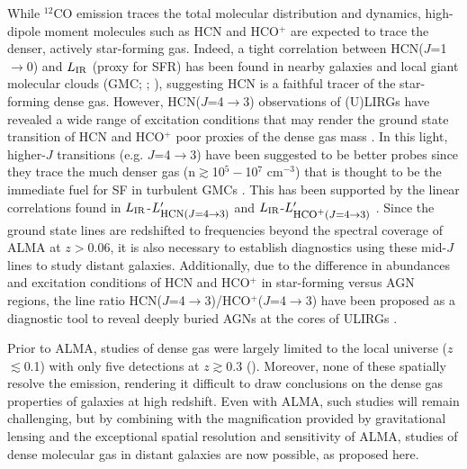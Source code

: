 \documentclass[12pt,a4paper]{article}
\newcommand{\comol}{$^{12}$CO\xspace}
\newcommand{\LIR}{\mbox{$L_{\rm IR}$}\xspace}
\newcommand{\rarr}{$\rightarrow$}
\newcommand{\ahcn}{HCN($J$=1\rarr0)\xspace}
\newcommand{\dhcn}{HCN($J$=4\rarr3)\xspace}
\newcommand{\hcop}{HCO$^+$\xspace}
\newcommand{\dhcop}{HCO$^+$($J$=4\rarr3)\xspace}
\newcommand{\Lp}[1][CO]{\mbox{$L^{\prime}_\textrm{\fontsize{8pt}{12pt}\selectfont{#1}}$}}
\begin{document}
While \comol emission traces the total molecular distribution and dynamics,
high-dipole moment molecules such as HCN and \hcop are expected to trace the 
denser, actively star-forming gas. Indeed, a tight correlation between \ahcn and \LIR 
(proxy for SFR) has been found in nearby galaxies and local giant molecular 
clouds (GMC; \citealt[hereafter GS04]{Gao04a}; \citealt{Wu05}), 
suggesting HCN is a faithful tracer of the star-forming dense gas.
However, \dhcn observations of (U)LIRGs have revealed a wide range of
excitation conditions 
that may render the ground state transition of 
HCN and \hcop poor proxies of the dense gas mass \citep[hereafter P07]{Papadopoulos07a}.
In this light, higher-$J$ transitions (e.g. $J$=4\rarr3) 
have been suggested to be better probes
since they trace the much denser gas (n$\gtrsim$10$^5-$10$^7$ cm$^{-3}$) that is 
thought to be the immediate fuel for SF in turbulent GMCs \citep{Shirley03a, KM05}. 
This has been supported by the linear correlations found in 
\LIR-\Lp[\dhcn] and \LIR-\Lp[\dhcop] \citep[hereafter Z14]{Zhang14a}.
Since the 
ground state lines are redshifted to frequencies beyond the spectral coverage of ALMA
at $z$$>$0.06, it is also necessary to establish diagnostics using these mid-$J$ lines to 
study distant galaxies.
Additionally, due to the difference in abundances and excitation conditions of HCN and \hcop
in star-forming versus AGN regions, the line 
ratio \dhcn/\dhcop \citep{Imanishi14a, GB14a, Viti14a} have been 
proposed as
a diagnostic tool to reveal deeply buried AGNs at the cores of ULIRGs \citep{Izumi16a, Imanishi16a}.

Prior to ALMA, studies of dense gas were largely limited to the local universe ($z$$\lesssim$0.1) 
with only five detections
at $z$$\gtrsim0.3$ 
(\citealt{Riechers06a, Riechers07a, Riechers10a, Wagg05a, Gao07a}).
Moreover, none of these 
spatially resolve the emission, rendering it difficult 
to draw conclusions on the dense gas properties of galaxies at high redshift. 
Even with ALMA, such studies will remain challenging, but by combining with
the magnification provided by gravitational lensing and the exceptional spatial resolution and sensitivity of ALMA, 
studies
of dense molecular gas in distant galaxies are now possible, as proposed here.
\end{document}
